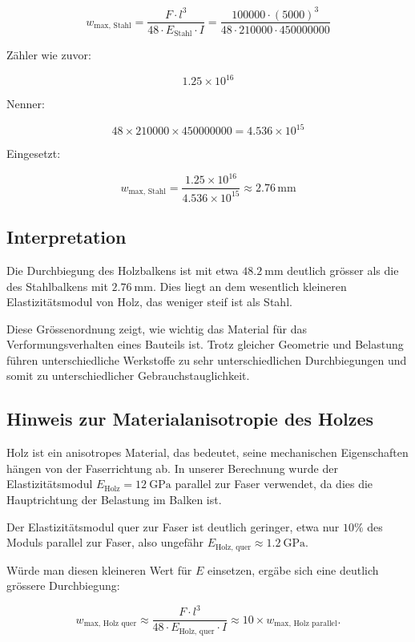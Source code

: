 \[
w_{\text{max, Stahl}} = \frac{F \cdot l^3}{48 \cdot E_{\text{Stahl}} \cdot I}
= \frac{100000 \cdot (5000)^3}{48 \cdot 210000 \cdot 450000000}
\]

Zähler wie zuvor:

\[
1.25 \times 10^{16}
\]

Nenner:

\[
48 \times 210000 \times 450000000 = 4.536 \times 10^{15}
\]

Eingesetzt:

\[
w_{\text{max, Stahl}} = \frac{1.25 \times 10^{16}}{4.536 \times 10^{15}} \approx 2.76\, \mathrm{mm}
\]

\subsection*{Interpretation}

Die Durchbiegung des Holzbalkens ist mit etwa \(\SI{48.2}{\milli\meter}\) deutlich grösser als die des Stahlbalkens mit \(\SI{2.76}{\milli\meter}\). 
Dies liegt an dem wesentlich kleineren Elastizitätsmodul von Holz, das weniger steif ist als Stahl.

Diese Grössenordnung zeigt, wie wichtig das Material für das Verformungsverhalten eines Bauteils ist. 
Trotz gleicher Geometrie und Belastung führen unterschiedliche Werkstoffe zu sehr unterschiedlichen Durchbiegungen und somit zu unterschiedlicher Gebrauchstauglichkeit.

\subsection*{Hinweis zur Materialanisotropie des Holzes}

Holz ist ein anisotropes Material, das bedeutet, seine mechanischen Eigenschaften hängen von der Faserrichtung ab. 
In unserer Berechnung wurde der Elastizitätsmodul \( E_{\text{Holz}} = \SI{12}{\giga\pascal} \) parallel zur Faser verwendet, da dies die Hauptrichtung der Belastung im Balken ist.

Der Elastizitätsmodul quer zur Faser ist deutlich geringer, etwa nur \(10\%\) des Moduls parallel zur Faser, also ungefähr \( E_{\text{Holz, quer}} \approx \SI{1.2}{\giga\pascal} \).

Würde man diesen kleineren Wert für \( E \) einsetzen, ergäbe sich eine deutlich grössere Durchbiegung:

\[
w_{\text{max, Holz quer}} \approx \frac{F \cdot l^3}{48 \cdot E_{\text{Holz, quer}} \cdot I} \approx 10 \times w_{\text{max, Holz parallel}}.
\]

